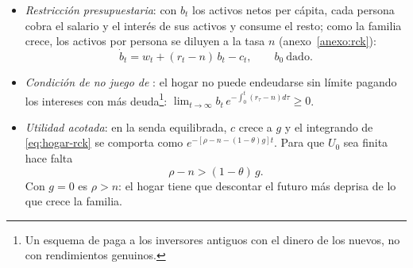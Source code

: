 \documentclass[11pt]{article}
\begin{document}
\begin{itemize}
\begin{itemize}
  \item \emph{la utilidad instantánea} del consumo per cápita es isoelástica (CRRA), la misma de la teoría del consumidor  y de las teorías del consumo . Como no hay incertidumbre, $\theta$ no mide aquí la aversión al riesgo, sino el  en el tiempo: la  es $1/\theta$ . Cuanto mayor es $\theta$, más cóncava es la función. Con $\theta\to1$, $u(x)=\ln x$\footnote{Por la regla de l'Hôpital, derivando respecto a $\theta$: $\lim_{\theta\to1}(x^{1-\theta}-1)/(1-\theta)=\lim_{\theta\to1}(-x^{1-\theta}\ln x)/(-1)=\ln x$. El $-1$ del numerador es lo que hace del límite una indeterminación del tipo $0/0$: sin él sería infinito. El $-1$ no cambia la solución, porque solo suma una constante; el 3.B.31 lo omite.};
  \item \emph{el descuento exponencial} a la tasa $\rho>0$, la : cuanto mayor es $\rho$, más impaciente es el hogar\nocite{Samuelson1937} \footnote{El descuento exponencial es el único que da preferencias dinámicamente consistentes cuando solo importa la distancia al presente\nocite{Strotz1955Myopia}. La economía del comportamiento ha documentado un descuento que cae deprisa a corto plazo y despacio a largo, \emph{hiperbólico}, como el generalizado de \textcite{LoewensteinPrelec1992}, que lleva a decisiones inconsistentes en el tiempo; su versión más usada es la de   .};
  \item \emph{el tamaño del hogar}: el hogar valora la utilidad de cada miembro, $L_t\,u(c_t)=e^{nt}u(c_t)$, y al descontarla a $\rho$ el descuento efectivo es $\rho-n$.
  \end{itemize}
\item \emph{Restricción presupuestaria}: con $b_t$ los activos netos per cápita, cada persona cobra el salario y el interés de sus activos y consume el resto; como la familia crece, los activos por persona se diluyen a la tasa $n$ (anexo~\ref{anexo:rck}):
  \[\dot b_t=w_t+(r_t-n)\,b_t-c_t,\qquad b_0\ \text{dado}.\]
\item \emph{Condición de no juego de }: el hogar no puede endeudarse sin límite pagando los intereses con más deuda\footnote{Un esquema de  paga a los inversores antiguos con el dinero de los nuevos, no con rendimientos genuinos.}: $\lim_{t\to\infty}b_t\,e^{-\int_0^t(r_\tau-n)d\tau}\geq0$.
\item \emph{Utilidad acotada}: en la senda equilibrada, $c$ crece a $g$ y el integrando de \eqref{eq:hogar-rck} se comporta como $e^{-[\rho-n-(1-\theta)g]t}$. Para que $U_0$ sea finita hace falta
  \[\rho-n>(1-\theta)\,g.\]
  Con $g=0$ es $\rho>n$: el hogar tiene que descontar el futuro más deprisa de lo que crece la familia.
\end{itemize}
\end{document}
